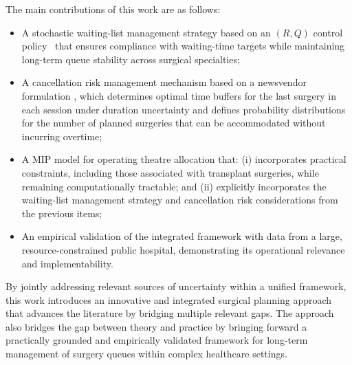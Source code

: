 The main contributions of this work are as follows:
\begin{itemize}
    \item A stochastic waiting-list management strategy based on an $(R,Q)$ control policy~\citep{Axsater2015Inv} that ensures compliance with waiting-time targets while maintaining long-term queue stability across surgical specialties;
    \item A cancellation risk management mechanism based on a newsvendor formulation \citep{Arrow:1951}, which determines optimal time buffers for the last surgery in each session under duration uncertainty and defines probability distributions for the number of planned surgeries that can be accommodated without incurring overtime;
    \item A MIP model for operating theatre allocation that: (i) incorporates practical constraints, including those associated with transplant surgeries, while remaining computationally tractable; and (ii) explicitly incorporates the waiting-list management strategy and cancellation risk considerations from the previous items;
    \item An empirical validation of the integrated framework with data from a large, resource-constrained public hospital, demonstrating its operational relevance and implementability.
\end{itemize}

By jointly addressing relevant sources of uncertainty within a unified framework, this work introduces an innovative and integrated surgical planning approach that advances the literature by bridging multiple relevant gaps. The approach also bridges the gap between theory and practice by bringing forward a practically grounded and empirically validated framework for long-term management of surgery queues within complex healthcare settings.
